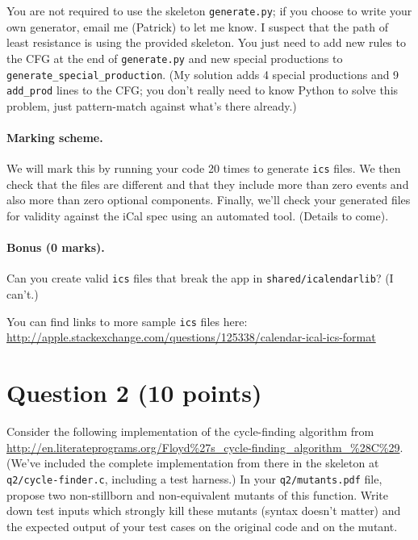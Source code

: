 \documentclass[10pt,hidelinks]{article}
\begin{document}
You are not required to use the skeleton {\tt generate.py}; if you choose to write your own
generator, email me (Patrick) to let me know. I suspect that the path of least resistance is
using the provided skeleton. You just need to add new rules to the CFG at the end of {\tt generate.py}
and new special productions to {\tt generate\_special\_production}. (My solution adds 4
special productions and 9 {\tt add\_prod} lines to the CFG; you don't really need to know
Python to solve this problem, just pattern-match against what's there already.)

\paragraph{Marking scheme.} We will mark this by running your code 20 times to generate
          {\tt ics} files. We then check that the files are different and that they include more
          than zero events and also more than zero optional components. Finally, we'll check
          your generated files for validity against the iCal spec using an automated tool.
          (Details to come).

\paragraph{Bonus (0 marks).} Can you create valid {\tt ics} files that break the app in {\tt shared/icalendarlib}? (I can't.)

          
You can find links to more sample {\tt ics} files here:\\
\url{http://apple.stackexchange.com/questions/125338/calendar-ical-ics-format}

\section*{Question 2 (10 points)} 

Consider the following implementation of the cycle-finding algorithm from \url{http://en.literateprograms.org/Floyd%27s_cycle-finding_algorithm_%28C%29}. (We've included the complete implementation from there in the skeleton at {\tt q2/cycle-finder.c}, including a test harness.) In your {\tt q2/mutants.pdf} file, propose two non-stillborn and non-equivalent mutants of this function. Write down test inputs which strongly kill these mutants (syntax doesn't matter) and the expected output of your test cases on the original code and on the mutant.
\end{document}
